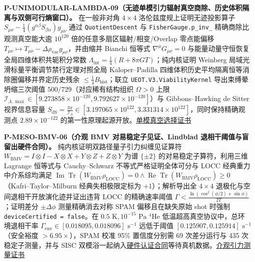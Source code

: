 \documentclass[
  11pt,
  oneside]{book}
\begin{document}
\textbf{P-UNIMODULAR-LAMBDA-09（无迹单模引力辐射真空商除、历史体积隔离与双侧可行熵窗口）。}
在一般非对角 \(4\times 4\) 洛伦兹度规上证明无迹投影算子
\(S_{\mu\nu} - \frac{1}{4}(g^{\alpha\beta}S_{\beta\alpha})g_{\mu\nu}\)
通过 \texttt{Quotient\allowbreak Descent} 与 \texttt{Fisher\allowbreak Gauge.\allowbreak p\_\allowbreak inv\_}
精确商除比观测真空能大逾 \(10^{120}\) 倍的任意多扇区辐射/相变/Overlap
零点能偏移
\(T_{\mu\nu} \mapsto T_{\mu\nu} - \Delta\rho_{\mathrm{vac}}g_{\mu\nu}\)，并由缩并
Bianchi 恒等式 \(\nabla^\mu G_{\mu\nu} = 0\)
与能量动量守恒恢复全局四维体积共轭积分常数
\(\Lambda_{\mathrm{int}} = \frac{1}{4}(R + 8\pi G T)\)；纯内核证明
Weinberg 局域光滑标量平衡调节禁行定理对照全局 Kaloper--Padilla
四维体积历史平均隔离恒等消除圈偏移并界定历史残余
\(\le \frac{1}{4} B_{\mathrm{hist}}\)；联立
\texttt{UEOT.\allowbreak V3.\allowbreak Viability\allowbreak Kernel} 导出束缚晕坍缩三次阈值
\(500/729\)（对应稀有结构组织 \(\Omega>0\) 上限
\(\mathcal{I}_{\Lambda,\max} \in [9.273858\times 10^{-120}, 9.792627\times 10^{-120}]\)）与
Gibbons--Hawking de Sitter 视界信息容量
\(S_{\mathrm{dS}} = \frac{3\pi}{\mathcal{I}_\Lambda} \in [3.197065\times 10^{122}, 3.331314\times 10^{122}]\)，同时保持精确观测点
\(2.89\times 10^{-122}\)
的第一性原理起源开放。\href{../../unification/unimodular_vacuum_selection/certificate.json}{单模真空选择证书}

\protect\hypertarget{p-meso-bmv-06}{}{}

\textbf{P-MESO-BMV-06（介观 BMV 对易稳定子见证、Lindblad
退相干阈值与盲留出硬件合同）。} 纯内核证明双路径量子引力纠缠见证算符
\(W_{\mathrm{BMV}} = I\otimes I - X\otimes X + Y\otimes Z + Z\otimes Y\)
为谱 \(\{\pm 2\}\) 的对易稳定子算符，利用三维 Lagrange 恒等式与
Cauchy--Schwarz 不等式严格证明全体可分与 LOCC 经典重力中介系综均满足
\(\operatorname{Im}\operatorname{Tr}(W_{\mathrm{BMV}}\rho_{\mathrm{LOCC}})=0 \land \operatorname{Re}\operatorname{Tr}(W_{\mathrm{BMV}}\rho_{\mathrm{LOCC}})\ge 0\)（Kafri--Taylor--Milburn
经典失相极限定标为 \(+1\)）；解析导出全 \(4\times 4\)
退极化与空间退相干开放演化迹并证出违背 LOCC 的精确速率阈值
\(\Gamma < \frac{\ln(\cos^2(\phi/2)+\sin\phi)}{2T}\)；证明差分
\(\pm\Delta\phi\) 测量精确消去对称 SPAM 偏移且在缺失原始 shot 时强制
\texttt{device\allowbreak Certified\ =\ false}。在
\(0.5\text{ K}, 10^{-15}\text{ Pa}\) \(^{4}\mathrm{He}\)
低温超高真空协议中，总环境退相干率
\(\Gamma_{\mathrm{env}} \in [0.018095, 0.018096]\text{ s}^{-1}\)
远低于阈值 \([0.125907, 0.125914]\text{ s}^{-1}\)（安全裕度
\(>6.95\times\)），SPAM 校准 95\% 置信度分别需 69 次差分运行与 435
次稳定子测量，并与 SISC
双模浴一起纳入\href{../../../validation/physics_unification/HARDWARE_CERTIFICATION_CONTRACT.md}{硬件认证合同}等待真机数据。\href{../../unification/mesoscopic_decoherence_gravimetry/certificate.json}{介观引力测量证书}
\end{document}
